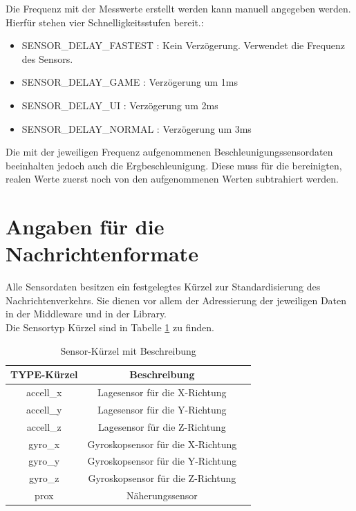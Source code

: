 \documentclass[11pt,a4paper]{report}
\begin{document}
Die Frequenz mit der Messwerte erstellt werden kann manuell angegeben werden.
Hierfür stehen vier Schnelligkeitsstufen bereit.:
\begin{itemize}
  \item SENSOR\_DELAY\_FASTEST : Kein Verzögerung. Verwendet die Frequenz des Sensors.
  \item SENSOR\_DELAY\_GAME : Verzögerung um 1ms
  \item SENSOR\_DELAY\_UI : Verzögerung um 2ms
  \item SENSOR\_DELAY\_NORMAL : Verzögerung um 3ms
\end{itemize}
Die mit der jeweiligen Frequenz aufgenommenen Beschleunigungssensordaten beeinhalten jedoch auch die Ergbeschleunigung.
Diese muss für die bereinigten, realen Werte zuerst noch von den aufgenommenen Werten subtrahiert werden\cite{accel_g}.


\section{Angaben für die Nachrichtenformate}
Alle Sensordaten besitzen ein festgelegtes Kürzel zur Standardisierung des Nachrichtenverkehrs.
Sie dienen vor allem der Adressierung der jeweiligen Daten in der Middleware und in der Library.
\\
Die Sensortyp Kürzel sind in Tabelle \ref{tab:sensor_types} zu finden. 
\begin{table}[htbp]
  \centering
  \begin{tabular}{|c|c|c}
      \hline
      TYPE-Kürzel & Beschreibung \\
      \hline
      accell\_x & Lagesensor für die X-Richtung \\
      \hline
      accell\_y & Lagesensor für die Y-Richtung \\
      \hline
      accell\_z & Lagesensor für die Z-Richtung \\
      \hline
       gyro\_x & Gyroskopsensor für die X-Richtung \\
      \hline
      gyro\_y & Gyroskopsensor für die Y-Richtung \\
      \hline
      gyro\_z & Gyroskopsensor für die Z-Richtung \\
      \hline
      prox & Näherungssensor \\
      \hline

  \end{tabular}
  \caption{Sensor-Kürzel mit Beschreibung}
  \label{tab:sensor_types}
\end{table}
\end{document}
